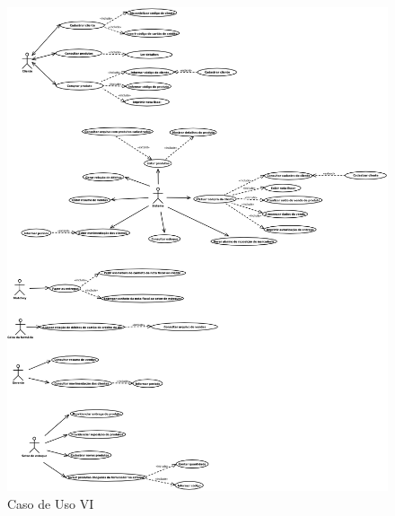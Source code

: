 \documentclass[a4paper,26pt]{article}
\begin{document}
\begin{figure}[ht]
  \centering
  \includegraphics[width=14.5cm]{./CasoDeUso6.png}
  \caption{Caso de Uso VI}
  \label{fig:quadcorephota}
\end{figure}
\end{document}
